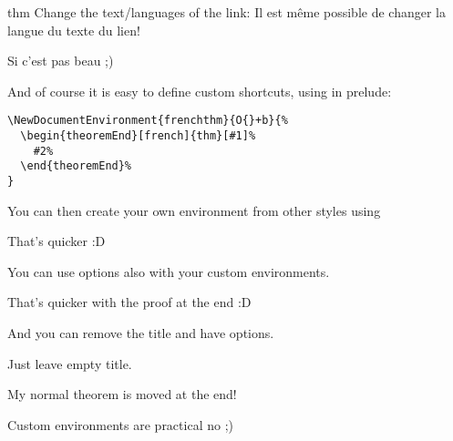 \documentclass{article}
\begin{document}
\begin{theoremEnd}[french]{thm}%
  Change the text/languages of the link: Il est même possible de changer la langue du texte du lien!  
\end{theoremEnd}
\begin{proofEnd}
  Si c'est pas beau ;)
\end{proofEnd}

And of course it is easy to define custom shortcuts, using in prelude:
\begin{verbatim}
\NewDocumentEnvironment{frenchthm}{O{}+b}{%
  \begin{theoremEnd}[french]{thm}[#1]%
    #2%
  \end{theoremEnd}%
}
\end{verbatim}

\begin{mynormalthm}
  You can then create your own environment from other styles using
\end{mynormalthm}
\begin{proofEnd}
  That's quicker :D
\end{proofEnd}

\begin{mynormalthm}
  You can use options also with your custom environments.
\end{mynormalthm}
\begin{proofEnd}
  That's quicker with the proof at the end :D
\end{proofEnd}

\begin{mynormalthm}[][end]
  And you can remove the title and have options.
\end{mynormalthm}
\begin{proofEnd}
  Just leave empty title.
\end{proofEnd}

\begin{mynormalthm}
  My normal theorem is moved at the end!
\end{mynormalthm}
\begin{proofEnd}
  Custom environments are practical no ;)
\end{proofEnd}
\end{document}
